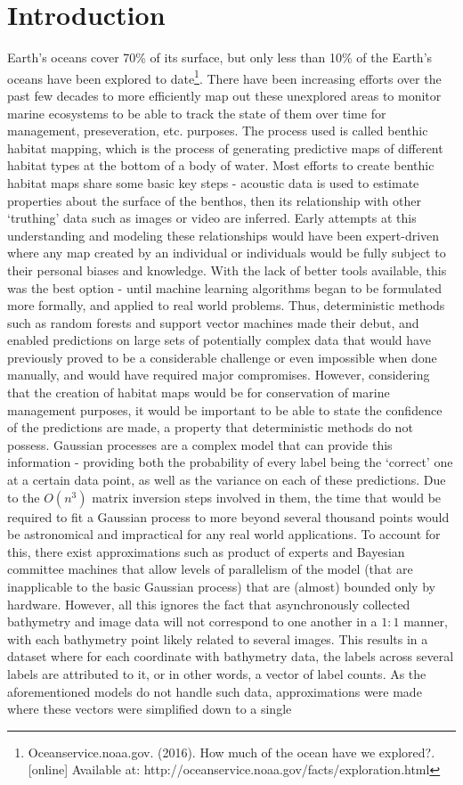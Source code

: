 \chapter{Introduction}

Earth's oceans cover 70\% of its surface, but only less than 10\% of the Earth's oceans have been explored to date\footnote{Oceanservice.noaa.gov. (2016). How much of the ocean have we explored?. [online] Available at: http://oceanservice.noaa.gov/facts/exploration.html}. There have been increasing efforts over the past few decades to more efficiently map out these unexplored areas to monitor marine ecosystems to be able to track the state of them over time for management, preseveration, etc. purposes. The process used is called benthic habitat mapping, which is the process of generating predictive maps of different habitat types at the bottom of a body of water. Most efforts to create benthic habitat maps share some basic key steps - acoustic data is used to estimate properties about the surface of the benthos, then its relationship with other `truthing' data such as images or video are inferred. Early attempts at this understanding and modeling these relationships would have been expert-driven where any map created by an individual or individuals would be fully subject to their personal biases and knowledge. With the lack of better tools available, this was the best option - until machine learning algorithms began to be formulated more formally, and applied to real world problems. Thus, deterministic methods such as random forests and support vector machines made their debut, and enabled predictions on large sets of potentially complex data that would have previously proved to be a considerable challenge or even impossible when done manually, and would have required major compromises. However, considering that the creation of habitat maps would be for conservation of marine management purposes, it would be important to be able to state the confidence of the predictions are made, a property that deterministic methods do not possess. Gaussian processes are a complex model that can provide this information - providing both the probability of every label being the `correct' one at a certain data point, as well as the variance on each of these predictions. Due to the $O(n^3)$ matrix inversion steps involved in them, the time that would be required to fit a Gaussian process to more beyond several thousand points would be astronomical and impractical for any real world applications. To account for this, there exist approximations such as product of experts and Bayesian committee machines that allow levels of parallelism of the model (that are inapplicable to the basic Gaussian process) that are (almost) bounded only by hardware. However, all this ignores the fact that asynchronously collected bathymetry and image data will not correspond to one another in a $1:1$ manner, with each bathymetry point likely related to several images. This results in a dataset where for each coordinate with bathymetry data, the labels across several labels are attributed to it, or in other words, a vector of label counts. As the aforementioned models do not handle such data, approximations were made where these vectors were simplified down to a single 